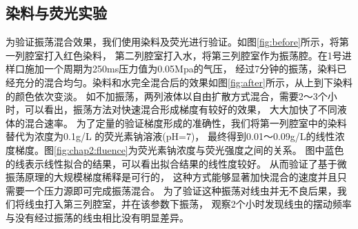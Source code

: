 \subsection{染料与荧光实验}
为验证振荡混合效果，我们使用染料及荧光进行验证。如图\ref{fig:before}所示，将第一列腔室打入红色染料，
第二列腔室打入水，将第三列腔室作为振荡腔。在1号进样口施加一个周期为250ms压力值为0.05Mpa的气压，
经过7分钟的振荡，染料已经充分的混合均匀。染料和水完全混合后的效果如图\ref{fig:after}所示，从上到下染料的颜色依次变淡。
如不加振荡，两列液体以自由扩散方式混合，需要2～3个小时，可以看出，振荡方法对快速混合形成梯度有较好的效果，
大大加快了不同液体的混合速率。
为了定量的验证梯度形成的准确性，我们将第一列腔室中的染料替代为浓度为0.1g/L 的荧光素钠溶液(pH=7)，
最终得到0.01～0.09g/L的线性浓度梯度。图\ref{fig:chap2:fluence}为荧光素钠浓度与荧光强度之间的关系。
图中蓝色的线表示线性拟合的结果，可以看出拟合结果的线性度较好。
从而验证了基于微振荡原理的大规模梯度稀释是可行的，
这种方式能够显著加快混合的速度并且只需要一个压力源即可完成振荡混合。
为了验证这种振荡对线虫并无不良后果，我们将线虫打入第三列腔室，并在该参数下振荡，
观察2个小时发现线虫的摆动频率与没有经过振荡的线虫相比没有明显差异。

